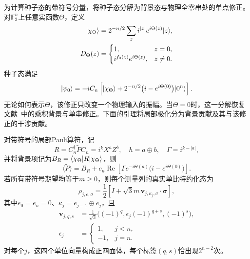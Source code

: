 为计算种子态的带符号分量，将种子态分解为背景态与物理全零串处的单点修正。对$\mathbb F_2^n$上任意实函数$\Theta$，定义
\begin{align}
 \lvert \chi_\Theta\rangle&=2^{-n/2}\sum_z i^{|z|}e^{i\Theta(z)}\lvert z\rangle,\nonumber\\
 D_\Theta(z)&=\begin{cases}1,&z=0,\\
 i^{f_0(z)}e^{i\Theta(z)},&z\ne0.
 \end{cases}
 \label{core:background}
\end{align}
种子态满足
\begin{equation}
 \lvert \psi_0\rangle=-iC_n\left[\lvert \chi_\Theta\rangle
 +2^{-n/2}\big(i-e^{i\Theta(0)}\big)\lvert 0^n\rangle\right].
 \label{core:defect-state}
\end{equation}
无论如何表示$\Theta$，该修正只改变一个物理输入的振幅。当$\Theta=0$时，这一分解恢复文献~\cite{PauwelsGisin2026}中的乘积背景与单串修正。下面的引理将局部极化分为背景贡献及其与该修正的干涉贡献。

\begin{lemma}[局部相位机制]
\label{core:mechanism}
对带符号的局部Pauli算符，记
\begin{equation}
 R=C_n^\dagger\widetilde P C_n=i^kX^aZ^b,\quad
 h=a\oplus b,\quad\Gamma=i^{k-|a|},
 \label{core:pauli-notation}
\end{equation}
并将背景项记为$B_R=\langle \chi_\Theta\rvert R\lvert \chi_\Theta\rangle$，则
\begin{equation}
 \langle\widetilde P\rangle
 =B_R+c_n\operatorname{Re}\!\left[
 \Gamma e^{-i\Theta(a)}\big(i-e^{i\Theta(0)}\big)\right].
 \label{core:signal}
\end{equation}
若所有带符号期望均等于$m\ge0$，则每个测量列的真实单比特约化态为
\begin{equation}
 \rho_{j,e,\sigma}
 =\frac12\left[I+\sqrt3m\,\mathbf v_{j,\kappa_j,\sigma}
 \cdot\boldsymbol\sigma\right],
 \label{core:bloch-orbit}
\end{equation}
其中$e_0=e_n=0$、$\kappa_j=e_{j-1}\oplus e_j$，且
\begin{equation}
 \begin{aligned}
 \mathbf v_{j,q,s}&=\frac1{\sqrt3}
 \big((-1)^q,\epsilon_j(-1)^{q+s},(-1)^s\big),\\
 \epsilon_j&=\begin{cases}1,&j<n,\\-1,&j=n.\end{cases}
 \end{aligned}
 \label{core:vertices}
\end{equation}
对每个$j$，这四个单位向量构成正四面体，每个标签$(q,s)$恰出现$2^{n-2}$次。
\end{lemma}

